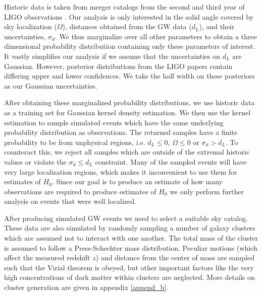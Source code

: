 
Historic data is taken from merger catalogs from the second and third year of LIGO observations \cite{GWTC_2,GWTC_3}. Our analysis is only interested in the solid angle covered by sky localization ($\Omega$), distances obtained from the GW data ($d_L$), and their uncertainties, $\sigma_d$. We thus marginalize over all other parameters to obtain a three dimensional probability distribution containing only these parameters of interest. It vastly simplifies our analysis if we assume that the uncertainties on $d_L$ are Gaussian. However, posterior distributions from the LIGO papers contain differing upper and lower confidences. We take the half width on these posteriors as our Gaussian uncertainties.

After obtaining these marginalized probability distributions, we use historic data as a training set for Gaussian kernel density estimation. We then use the kernel estimation to sample simulated events which have the same underlying probability distribution as observations. The returned samples have a finite probability to be from unphysical regions, i.e. $d_L \leq 0$, $\Omega\leq 0$ or $\sigma_d > d_L$. To counteract this, we reject all samples which are outside of the extremal historic values or violate the $\sigma_d \leq d_L$ constraint. Many of the sampled events will have very large localization regions, which makes it inconvenient to use them for estimates of $H_0$. Since our goal is to produce an estimate of how many observations are required to produce estimates of $H_0$ we only perform further analysis on events that were well localized.

After producing simulated GW events we need to select a suitable sky catalog. These data are also simulated by randomly sampling a number of galaxy clusters which are assumed not to interact with one another. The total mass of the cluster is assumed to follow a Press-Schechter mass distribution\cite{Press_1974}. Peculiar motions (which affect the measured redshift $z$) and distance from the center of mass are sampled such that the Virial theorem is obeyed, but other important factors like the very high concentrations of dark matter within clusters are neglected. More details on cluster generation are given in appendix \ref{append_b}.
    

